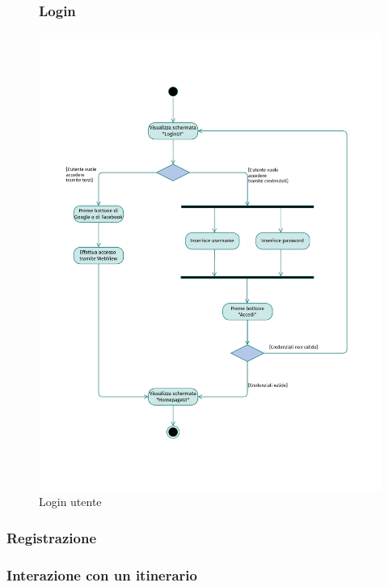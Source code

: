 \documentclass{natourDoc}
\begin{document}
	\begin{figure}[!htbp]
		\subsubsection{Login}
		\centering
		\includegraphics[width=\textwidth, page=1]{./diagrams/activity.pdf}
		\caption{Login utente}
	\end{figure}
	\FloatBarrier

	\newpage
	\subsubsection{Registrazione}

	\newpage
	\subsubsection{Interazione con un itinerario}
\end{document}
